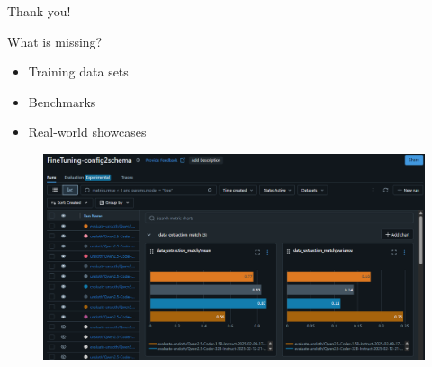 \documentclass[aspectratio=169]{beamer}
\begin{document}
{
  \begin{frame}[plain,c]
    \begin{center}
      \Huge \color[rgb]{1,1,1}Thank you!
    \end{center}
  \end{frame}
}

\begin{frame}{What is missing?}

  \begin{itemize}
    \setlength\itemsep{1em}
    \item Training data sets
    \item Benchmarks
    \item Real-world showcases
  \end{itemize}

\end{frame}

\begin{frame}

  \begin{figure}
    \includegraphics[width = \textwidth]{images/mlflow.png}
  \end{figure}

\end{frame}
\end{document}
